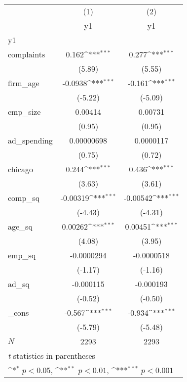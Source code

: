 {
\def\sym#1{\ifmmode^{#1}\else\(^{#1}\)\fi}
\begin{tabular}{l*{2}{c}}
\hline\hline
            &\multicolumn{1}{c}{(1)}&\multicolumn{1}{c}{(2)}\\
            &\multicolumn{1}{c}{y1}&\multicolumn{1}{c}{y1}\\
\hline
y1          &                     &                     \\
complaints  &       0.162\sym{***}&       0.277\sym{***}\\
            &      (5.89)         &      (5.55)         \\
[1em]
firm\_age    &     -0.0938\sym{***}&      -0.161\sym{***}\\
            &     (-5.22)         &     (-5.09)         \\
[1em]
emp\_size    &     0.00414         &     0.00731         \\
            &      (0.95)         &      (0.95)         \\
[1em]
ad\_spending &  0.00000698         &   0.0000117         \\
            &      (0.75)         &      (0.72)         \\
[1em]
chicago     &       0.244\sym{***}&       0.436\sym{***}\\
            &      (3.63)         &      (3.61)         \\
[1em]
comp\_sq     &    -0.00319\sym{***}&    -0.00542\sym{***}\\
            &     (-4.43)         &     (-4.31)         \\
[1em]
age\_sq      &     0.00262\sym{***}&     0.00451\sym{***}\\
            &      (4.08)         &      (3.95)         \\
[1em]
emp\_sq      &  -0.0000294         &  -0.0000518         \\
            &     (-1.17)         &     (-1.16)         \\
[1em]
ad\_sq       &   -0.000115         &   -0.000193         \\
            &     (-0.52)         &     (-0.50)         \\
[1em]
\_cons      &      -0.567\sym{***}&      -0.934\sym{***}\\
            &     (-5.79)         &     (-5.48)         \\
\hline
\(N\)       &        2293         &        2293         \\
\hline\hline
\multicolumn{3}{l}{\footnotesize \textit{t} statistics in parentheses}\\
\multicolumn{3}{l}{\footnotesize \sym{*} \(p<0.05\), \sym{**} \(p<0.01\), \sym{***} \(p<0.001\)}\\
\end{tabular}
}

